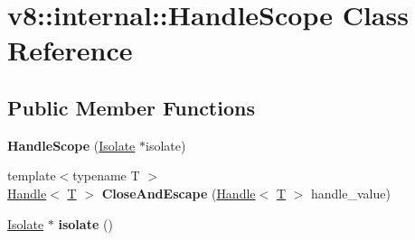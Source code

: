 \hypertarget{classv8_1_1internal_1_1HandleScope}{}\section{v8\+:\+:internal\+:\+:Handle\+Scope Class Reference}
\label{classv8_1_1internal_1_1HandleScope}
\subsection*{Public Member Functions}
\begin{DoxyCompactItemize}
\item 
\mbox{\label{classv8_1_1internal_1_1HandleScope_a3742f18d5b401cc58fcf6168ebca077d}} 
{\bfseries Handle\+Scope} (\mbox{\hyperlink{classv8_1_1internal_1_1Isolate}{Isolate}} $\ast$isolate)
\item 
\mbox{\label{classv8_1_1internal_1_1HandleScope_a37fa551b0621f759ebc0aed8d8061384}} 
{\footnotesize template$<$typename T $>$ }\\\mbox{\hyperlink{classv8_1_1internal_1_1Handle}{Handle}}$<$ \mbox{\hyperlink{classv8_1_1internal_1_1torque_1_1T}{T}} $>$ {\bfseries Close\+And\+Escape} (\mbox{\hyperlink{classv8_1_1internal_1_1Handle}{Handle}}$<$ \mbox{\hyperlink{classv8_1_1internal_1_1torque_1_1T}{T}} $>$ handle\+\_\+value)
\item 
\mbox{\label{classv8_1_1internal_1_1HandleScope_afebe38c26e4dad47b86d195898bd6400}} 
\mbox{\hyperlink{classv8_1_1internal_1_1Isolate}{Isolate}} $\ast$ {\bfseries isolate} ()
\end{DoxyCompactItemize}

